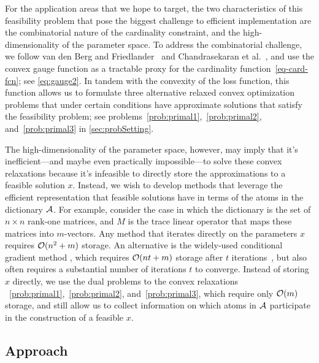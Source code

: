 For the application areas that we hope to target, the two characteristics of this feasibility problem that pose the biggest challenge to efficient implementation are the combinatorial nature of the cardinality constraint, and the high-dimensionality of the parameter space. To address the combinatorial challenge, we follow van den Berg and Friedlander~\cite{berg2008probing,berg2011sparse} and Chandrasekaran et al.~\cite{chandrasekaran2012convex}, and use the convex gauge function as a tractable proxy for the cardinality function~\eqref{eq-card-fcn}; see \eqref{eq:gauge2}. In tandem with the convexity of the loss function, this function allows us to formulate three alternative relaxed convex optimization problems that under certain conditions have approximate solutions that satisfy the feasibility problem; see problems~\eqref{prob:primal1},~\eqref{prob:primal2}, and~\eqref{prob:primal3} in \autoref{sec:probSetting}. 

The high-dimensionality of the parameter space, however, may imply that it's inefficient---and maybe even practically impossible---to solve these convex relaxations because it's infeasible to directly store the approximations to a feasible solution $x$. Instead, we wish to develop methods that leverage the efficient representation that feasible solutions have in terms of the atoms in the dictionary $\mathcal{A}$. For example, consider the case in which the dictionary is the set of ${n \times n}$ rank-one matrices, and $M$ is the trace linear operator that maps these matrices into $m$-vectors. Any method that iterates directly on the parameters $x$ requires $\mathcal{O}(n^2+m)$ storage. An alternative is the widely-used conditional gradient method \cite{frank1956algorithm}, which requires $\mathcal{O}( n t+m )$ storage after $t$ iterations~\cite{jaggi2013revisiting}, but also often requires a substantial number of iterations $t$ to converge. Instead of storing $x$ directly, we use the dual problems to the convex relaxations ~\eqref{prob:primal1},~\eqref{prob:primal2}, and~\eqref{prob:primal3}, which require only $\mathcal{O}(m)$ storage, and still allow us to collect information on which atoms in $\mathcal{A}$ participate in the construction of a feasible $x$.

\subsection{Approach}

